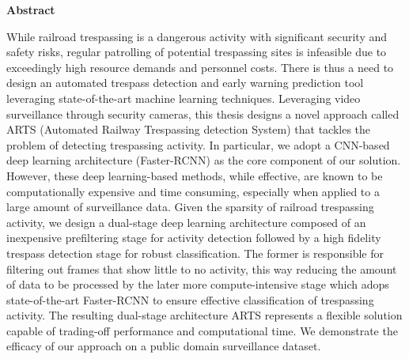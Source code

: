 
\begin{center} 
\textbf{Abstract}
\end{center}
While railroad trespassing is a dangerous activity with significant security and safety risks, regular patrolling of potential trespassing sites is infeasible due to exceedingly high resource demands and personnel costs. There is thus a need to design an automated trespass detection and early warning prediction tool leveraging state-of-the-art machine learning techniques.  Leveraging video surveillance through security cameras, this thesis designs a novel approach called ARTS (Automated Railway Trespassing detection System) that tackles the problem of detecting trespassing activity.  In particular, we adopt a CNN-based deep learning architecture (Faster-RCNN) as the core component of our solution. However, these deep learning-based methods, while effective, are known to be computationally expensive and time consuming, especially when applied to a large amount of surveillance data. Given the sparsity of railroad trespassing activity, we design a dual-stage deep learning architecture composed of an inexpensive prefiltering stage for activity detection followed by a high fidelity trespass detection stage for robust classification.  The former is responsible for filtering out frames that show little to no activity, this way reducing the amount of data to be processed by the later more compute-intensive stage which adops state-of-the-art Faster-RCNN to ensure effective classification of trespassing activity.  The resulting dual-stage architecture ARTS represents a flexible solution capable of trading-off performance and computational time. We demonstrate the efficacy of our approach on a public domain surveillance dataset.
\newpage